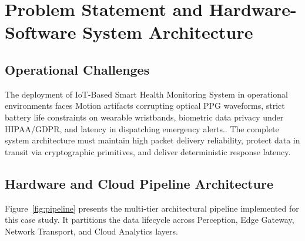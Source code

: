 \section{Problem Statement and Hardware-Software System Architecture}

\subsection{Operational Challenges}
The deployment of IoT-Based Smart Health Monitoring System in operational environments faces Motion artifacts corrupting optical PPG waveforms, strict battery life constraints on wearable wristbands, biometric data privacy under HIPAA/GDPR, and latency in dispatching emergency alerts.. The complete system architecture must maintain high packet delivery reliability, protect data in transit via cryptographic primitives, and deliver deterministic response latency.

\subsection{Hardware and Cloud Pipeline Architecture}
Figure~\ref{fig:pipeline} presents the multi-tier architectural pipeline implemented for this case study. It partitions the data lifecycle across Perception, Edge Gateway, Network Transport, and Cloud Analytics layers.

